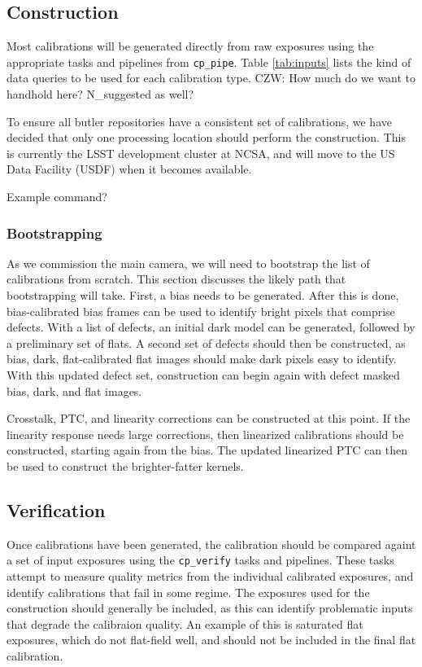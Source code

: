 \documentclass[DM,authoryear,toc]{lsstdoc}
\begin{document}
\subsection{Construction}

Most calibrations will be generated directly from raw exposures using the appropriate tasks and pipelines from \verb|cp_pipe|.  Table \ref{tab:inputs} lists the kind of data queries to be used for each calibration type.  CZW: How much do we want to handhold here?  N_suggested as well?

To ensure all butler repositories have a consistent set of calibrations, we have decided that only one processing location should perform the construction.  This is currently the LSST development cluster at NCSA, and will move to the US Data Facility (USDF) when it becomes available.

Example command?

\subsubsection{Bootstrapping}

As we commission the main camera, we will need to bootstrap the list of calibrations from scratch.  This section discusses the likely path that bootstrapping will take.  First, a bias needs to be generated.  After this is done, bias-calibrated bias frames can be used to identify bright pixels that comprise defects.  With a list of defects, an initial dark model can be generated, followed by a preliminary set of flats.  A second set of defects should then be constructed, as bias, dark, flat-calibrated flat images should make dark pixels easy to identify.  With this updated defect set, construction can begin again with defect masked bias, dark, and flat images.

Crosstalk, PTC, and linearity corrections can be constructed at this point.  If the linearity response needs large corrections, then linearized calibrations should be constructed, starting again from the bias.  The updated linearized PTC can then be used to construct the brighter-fatter kernels.

\subsection{Verification}

Once calibrations have been generated, the calibration should be compared againt a set of input exposures using the \verb|cp_verify| tasks and pipelines.  These tasks attempt to measure quality metrics from the individual calibrated exposures, and identify calibrations that fail in some regime.  The exposures used for the construction should generally be included, as this can identify problematic inputs that degrade the calibraion quality.  An example of this is saturated flat exposures, which do not flat-field well, and should not be included in the final flat calibration.
\end{document}
